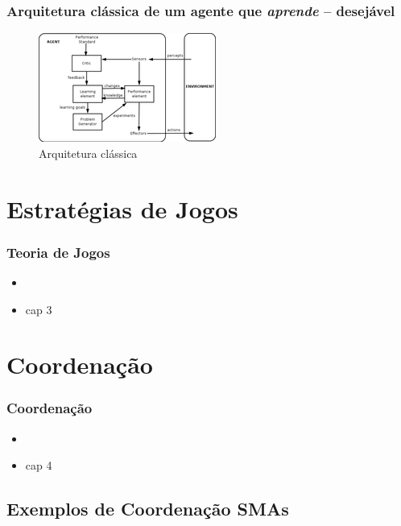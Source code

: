 \documentclass[10pt]{beamer}
\begin{document}
\begin{frame}

  \frametitle{Arquitetura clássica de um agente que \textit{aprende} -- desejável}
    
\begin{figure}[!ht]
\centering
\includegraphics[width=.6\textwidth]{figuras/agent-learning.png}
\caption{Arquitetura clássica}
\label{ag_01}
\end{figure}
    
\end{frame}


\section{Estratégias de Jogos}
\begin{frame}

    \frametitle{Teoria de Jogos}
    \begin{itemize}
    \pause
      \item 
\pause
      \item cap 3
    
    \end{itemize}
\end{frame}


\section{Coordenação}
\begin{frame}

    \frametitle{Coordenação}
    \begin{itemize}
    \pause
      \item 
\pause
      \item cap 4
    
    \end{itemize}
\end{frame}

\subsection{Exemplos de Coordenação SMAs}
\end{document}
